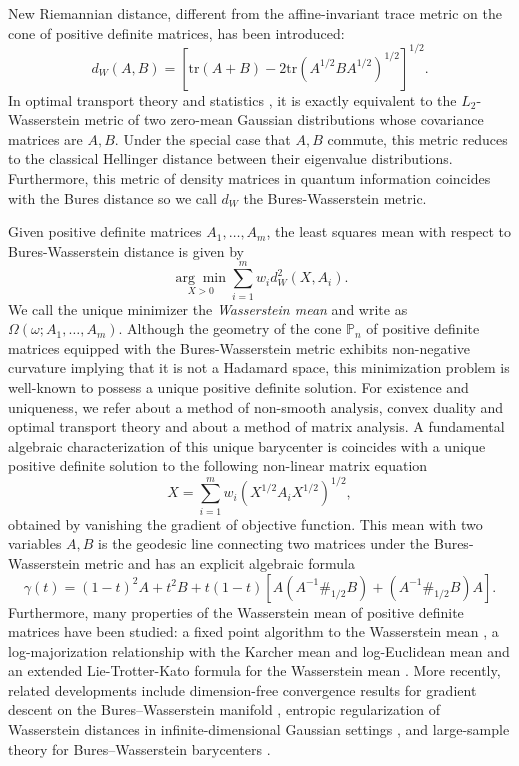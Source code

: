 \documentclass[12pt,reqno]{amsart}
\begin{document}
New Riemannian distance, different from the affine-invariant trace metric on the cone of positive definite matrices, has been introduced:
\begin{displaymath}
d_{W}(A, B) = \left[ \mathrm{tr} (A + B) - 2 \mathrm{tr} (A^{1/2} B A^{1/2})^{1/2} \right]^{1/2}.
\end{displaymath}
In optimal transport theory  \cite{V} and statistics \cite{PZ}, it is exactly equivalent to the $L_{2}$-Wasserstein metric of two zero-mean Gaussian distributions whose covariance matrices are $A, B$.
Under the special case that $A, B$ commute, this metric reduces to the classical Hellinger distance between their eigenvalue distributions.
Furthermore, this metric of density matrices in quantum information coincides with the Bures distance so we call $d_{W}$ the Bures-Wasserstein metric.

Given positive definite matrices $A_{1}, \dots, A_{m}$, the least squares mean with respect to Bures-Wasserstein distance is given by
\begin{displaymath}
\underset{X > 0}{\arg \min} \sum_{i=1}^{m} w_{i} d_{W}^{2}(X, A_{i}).
\end{displaymath}
We call the unique minimizer the \emph{Wasserstein mean} and write as $\Omega(\omega; A_{1}, \dots, A_{m})$.
Although the geometry of the cone $\mathbb{P}_{n}$ of positive definite matrices equipped with the Bures-Wasserstein metric exhibits non-negative curvature implying that it is not a Hadamard space, this minimization problem is well-known to possess a unique positive definite solution.
For existence and uniqueness, we refer \cite{AC} about a method of non-smooth analysis, convex duality and optimal transport theory and \cite{BJL} about a method of matrix analysis.
A fundamental algebraic characterization of this unique barycenter is
coincides with a unique positive definite solution to the following non-linear matrix equation
\begin{equation} \label{E:gradF}
X = \sum_{i=1}^{m} w_{i} (X^{1/2} A_{i} X^{1/2})^{1/2},
\end{equation}
obtained by vanishing the gradient of objective function. This mean with two variables $A, B$ is the geodesic line connecting two matrices under the Bures-Wasserstein metric and has an explicit algebraic formula
\begin{displaymath}
\gamma(t) = (1-t)^{2} A + t^{2} B + t(1-t) \left[ A (A^{-1} \#_{1/2} B) + (A^{-1} \#_{1/2} B) A \right].
\end{displaymath}
Furthermore, many properties of the Wasserstein mean of positive definite matrices have been studied: a fixed point algorithm to the Wasserstein mean \cite{ABCM}, a log-majorization relationship with the Karcher mean and log-Euclidean mean \cite{BJL-1} and an extended Lie-Trotter-Kato formula for the Wasserstein mean \cite{HK19}. More recently, related developments include dimension-free convergence results for gradient descent on the Bures--Wasserstein manifold \cite{ACGS}, entropic regularization of Wasserstein distances in infinite-dimensional Gaussian settings \cite{M-2}, and large-sample theory for Bures--Wasserstein barycenters \cite{SP}.
\end{document}
